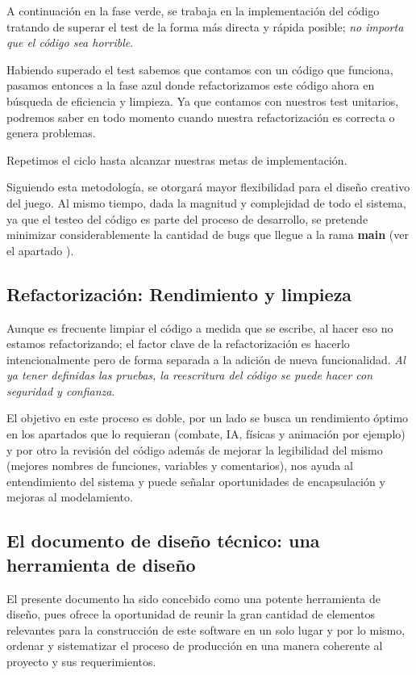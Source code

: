 A continuación en la fase verde, se trabaja en la implementación del código tratando de superar el test de la forma más directa y rápida posible; \textit{no importa que el código sea horrible}.

Habiendo superado el test sabemos que contamos con un código que funciona, pasamos entonces a la fase azul donde refactorizamos este código ahora en búsqueda de eficiencia y limpieza. Ya que contamos con nuestros test unitarios, podremos saber en todo momento cuando nuestra refactorización es correcta o genera problemas.

Repetimos el ciclo hasta alcanzar nuestras metas de implementación.

Siguiendo esta metodología, se otorgará mayor flexibilidad para el diseño creativo del juego. Al mismo tiempo, dada la magnitud y complejidad de todo el sistema, ya que el testeo del código es parte del proceso de desarrollo, se pretende minimizar considerablemente la cantidad de bugs que llegue a la rama \textbf{main} (ver el apartado ).

\subsection{Refactorización: Rendimiento y limpieza}\label{principios:refactorizacion-rendimiento-limpieza}
Aunque es frecuente limpiar el código a medida que se escribe, al hacer eso no estamos refactorizando; el factor clave de la refactorización es hacerlo intencionalmente pero de forma separada a la adición de nueva funcionalidad. \emph{Al ya tener definidas las pruebas, la reescritura del código se puede hacer con seguridad y confianza}.

El objetivo en este proceso es doble, por un lado se busca un rendimiento óptimo en los apartados que lo requieran (combate, IA, físicas y animación por ejemplo) y por otro la revisión del código además de mejorar la legibilidad del mismo (mejores nombres de funciones, variables y comentarios), nos ayuda al entendimiento del sistema y puede señalar oportunidades de encapsulación y mejoras al modelamiento.

\subsection{El documento de diseño técnico: una herramienta de diseño}\label{principios:documento-tecnico-como-herramienta}
El presente documento ha sido concebido como una potente herramienta de diseño, pues ofrece la oportunidad de reunir la gran cantidad de elementos relevantes para la construcción de este software en un solo lugar y por lo mismo, ordenar y sistematizar el proceso de producción en una manera coherente al proyecto y sus requerimientos.

